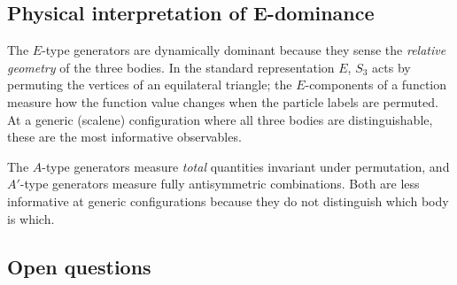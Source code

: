 \documentclass[11pt,a4paper]{article}
\theoremstyle{remark}
\newcommand{\SG}{S_3}
\begin{document}
\subsection{Physical interpretation of E-dominance}

The $E$-type generators are dynamically dominant because
they sense the \emph{relative geometry} of the three
bodies.  In the standard representation $E$, $\SG$ acts by
permuting the vertices of an equilateral triangle; the
$E$-components of a function measure how the function
value changes when the particle labels are permuted.  At
a generic (scalene) configuration where all three bodies
are distinguishable, these are the most informative
observables.

The $A$-type generators measure \emph{total} quantities
invariant under permutation, and $A'$-type generators
measure fully antisymmetric combinations.  Both are less
informative at generic configurations because they do not
distinguish which body is which.

\subsection{Open questions}
\end{document}
